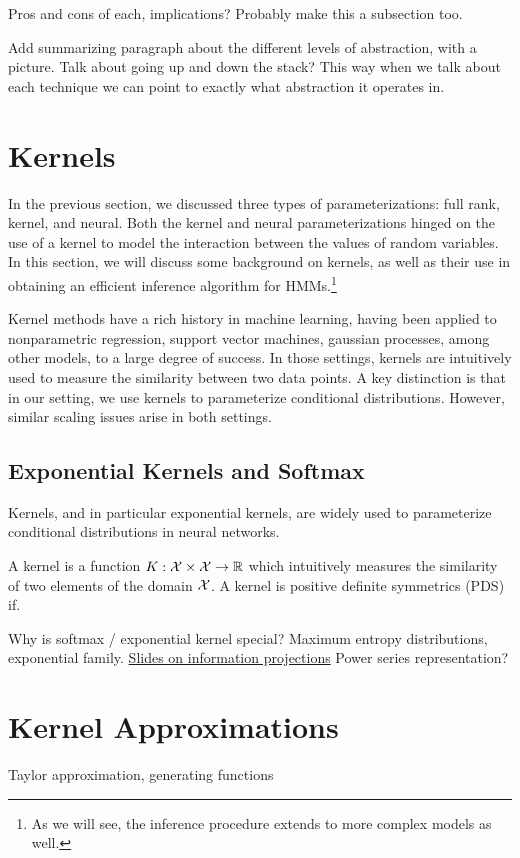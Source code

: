 \documentclass{article}
\begin{document}
Pros and cons of each, implications?
Probably make this a subsection too.

Add summarizing paragraph about the different levels of abstraction, with a picture.
Talk about going up and down the stack?
This way when we talk about each technique we can point
to exactly what abstraction it operates in.

\section{Kernels}
In the previous section, we discussed three types of parameterizations: full rank,
kernel, and neural. Both the kernel and neural parameterizations hinged on the use of
a kernel to model the interaction between the values of random variables.
In this section, we will discuss some background on kernels, as well as
their use in obtaining an efficient inference algorithm for HMMs.\footnote{
As we will see, the inference procedure extends to more complex models as well.
}

Kernel methods have a rich history in machine learning,
having been applied to nonparametric regression, support vector machines, gaussian processes,
among other models, to a large degree of success.
In those settings, kernels are intuitively used to measure the similarity between two data points.
A key distinction is that in our setting,
we use kernels to parameterize conditional distributions.
However, similar scaling issues arise in both settings.

\subsection{Exponential Kernels and Softmax}
Kernels, and in particular exponential kernels, are widely used to parameterize 
conditional distributions in neural networks.

A kernel is a function $K: \mathcal{X}\times\mathcal{X}\to\mathbb{R}$ which intuitively measures
the similarity of two elements of the domain $\mathcal{X}$.
A kernel is positive definite symmetrics (PDS) if.

Why is softmax / exponential kernel special?
Maximum entropy distributions, exponential family.
\href{https://www.lix.polytechnique.fr/~nielsen/CIG-slides.pdf}{Slides on information projections}
Power series representation?

\section{Kernel Approximations}
Taylor approximation, generating functions
\end{document}

